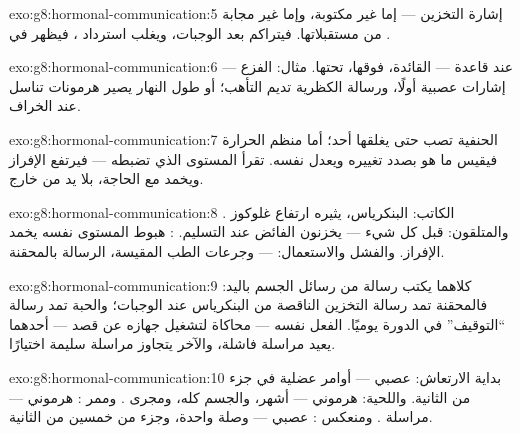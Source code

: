 \begin{solution}{exo:g8:hormonal-communication:5}
إشارة  التخزين --- إما غير مكتوبة، وإما غير مجابة
من مستقبلاتها. فيتراكم  بعد الوجبات، ويغلب
استرداد ، فيظهر في .
\end{solution}

\begin{solution}{exo:g8:hormonal-communication:6}
عند قاعدة  ---  القائدة، 
فوقها،  تحتها. مثال: الفزع --- إشارات عصبية
أولًا، ورسالة الكظرية تديم التأهب؛ أو طول النهار يصير
هرمونات تناسل عند الخراف.
\end{solution}

\begin{solution}{exo:g8:hormonal-communication:7}
الحنفية تصب حتى يغلقها أحد؛ أما منظم الحرارة فيقيس ما هو
بصدد تغييره ويعدل نفسه.  تقرأ المستوى الذي تضبطه
--- فيرتفع الإفراز ويخمد مع الحاجة، بلا يد من خارج.
\end{solution}

\begin{solution}{exo:g8:hormonal-communication:8}
الكاتب: البنكرياس، يثيره ارتفاع غلوكوز . والمتلقون:
  قبل كل شيء --- يخزنون الفائض عند التسليم.
: هبوط المستوى نفسه يخمد الإفراز. والفشل
والاستعمال:  --- وجرعات الطب المقيسة، الرسالة
بالمحقنة.
\end{solution}

\begin{solution}{exo:g8:hormonal-communication:9}
كلاهما يكتب رسالة من رسائل الجسم باليد: فالمحقنة تمد
رسالة التخزين الناقصة من البنكرياس عند الوجبات؛ والحبة
تمد رسالة ``التوقيف'' في الدورة يوميًا. الفعل نفسه ---
محاكاة  لتشغيل جهازه عن قصد --- أحدهما يعيد مراسلة
فاشلة، والآخر يتجاوز مراسلة سليمة اختيارًا.
\end{solution}

\begin{solution}{exo:g8:hormonal-communication:10}
بداية الارتعاش: عصبي --- أوامر عضلية في جزء من الثانية.
واللحية: هرموني --- أشهر، والجسم كله، ومجرى . وممر
: هرموني --- مراسلة . ومنعكس :
عصبي --- وصلة واحدة، وجزء من خمسين من الثانية.
\end{solution}

